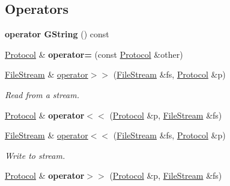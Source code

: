 \subsection*{Operators}
\begin{DoxyCompactItemize}
\item 
\mbox{\label{classrev_1_1_protocol_a6d59a39b4a179d20a195da7d2cd0ffd2}} 
{\bfseries operator G\+String} () const
\item 
\mbox{\label{classrev_1_1_protocol_af662e121bb3e6e0219ec340880771ef5}} 
\mbox{\hyperlink{classrev_1_1_protocol}{Protocol}} \& {\bfseries operator=} (const \mbox{\hyperlink{classrev_1_1_protocol}{Protocol}} \&other)
\item 
\mbox{\label{classrev_1_1_protocol_a34b5caf830673a709fb1a09194939483}} 
\mbox{\hyperlink{classrev_1_1_file_stream}{File\+Stream}} \& \mbox{\hyperlink{classrev_1_1_protocol_a34b5caf830673a709fb1a09194939483}{operator$>$$>$}} (\mbox{\hyperlink{classrev_1_1_file_stream}{File\+Stream}} \&fs, \mbox{\hyperlink{classrev_1_1_protocol}{Protocol}} \&p)
\begin{DoxyCompactList}\small\item\em Read from a stream. \end{DoxyCompactList}\item 
\mbox{\label{classrev_1_1_protocol_a5426d571ff6efb7153b172bf23c12b9d}} 
\mbox{\hyperlink{classrev_1_1_protocol}{Protocol}} \& {\bfseries operator$<$$<$} (\mbox{\hyperlink{classrev_1_1_protocol}{Protocol}} \&p, \mbox{\hyperlink{classrev_1_1_file_stream}{File\+Stream}} \&fs)
\item 
\mbox{\label{classrev_1_1_protocol_acf2e1efff90455be07228435d9ce0b52}} 
\mbox{\hyperlink{classrev_1_1_file_stream}{File\+Stream}} \& \mbox{\hyperlink{classrev_1_1_protocol_acf2e1efff90455be07228435d9ce0b52}{operator$<$$<$}} (\mbox{\hyperlink{classrev_1_1_file_stream}{File\+Stream}} \&fs, \mbox{\hyperlink{classrev_1_1_protocol}{Protocol}} \&p)
\begin{DoxyCompactList}\small\item\em Write to stream. \end{DoxyCompactList}\item 
\mbox{\label{classrev_1_1_protocol_a06a81710e806aa9f3f17529fd4c2bd19}} 
\mbox{\hyperlink{classrev_1_1_protocol}{Protocol}} \& {\bfseries operator$>$$>$} (\mbox{\hyperlink{classrev_1_1_protocol}{Protocol}} \&p, \mbox{\hyperlink{classrev_1_1_file_stream}{File\+Stream}} \&fs)
\end{DoxyCompactItemize}
